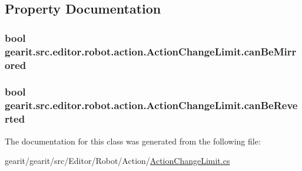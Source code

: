 \subsection{Property Documentation}
\hypertarget{classgearit_1_1src_1_1editor_1_1robot_1_1action_1_1_action_change_limit_abb4fb68a386e117f7ad9fd3810ed9ee8}{
\subsubsection[{can\+Be\+Mirrored}]{\setlength{\rightskip}{0pt plus 5cm}bool gearit.\+src.\+editor.\+robot.\+action.\+Action\+Change\+Limit.\+can\+Be\+Mirrored\hspace{0.3cm}{\ttfamily [get]}}}\label{classgearit_1_1src_1_1editor_1_1robot_1_1action_1_1_action_change_limit_abb4fb68a386e117f7ad9fd3810ed9ee8}
\hypertarget{classgearit_1_1src_1_1editor_1_1robot_1_1action_1_1_action_change_limit_ace97d8f95695e080c30d50d111791393}{
\subsubsection[{can\+Be\+Reverted}]{\setlength{\rightskip}{0pt plus 5cm}bool gearit.\+src.\+editor.\+robot.\+action.\+Action\+Change\+Limit.\+can\+Be\+Reverted\hspace{0.3cm}{\ttfamily [get]}}}\label{classgearit_1_1src_1_1editor_1_1robot_1_1action_1_1_action_change_limit_ace97d8f95695e080c30d50d111791393}


The documentation for this class was generated from the following file\+:\begin{DoxyCompactItemize}
\item 
gearit/gearit/src/\+Editor/\+Robot/\+Action/\hyperlink{_action_change_limit_8cs}{Action\+Change\+Limit.\+cs}\end{DoxyCompactItemize}
